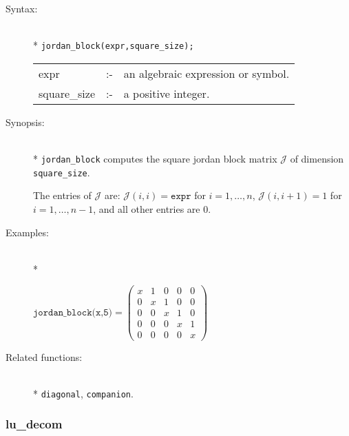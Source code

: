 \begin{description}
\item[Syntax:]\mbox{}\\*
\texttt{jordan\_block(expr,square\_size);}\\[2mm]
\begin{tabular}{l l l}
expr        &:-& an algebraic expression or symbol. \\
square\_size &:-& a positive integer.
\end{tabular}

\item[Synopsis:]\mbox{}\\*
\texttt{jordan\_block} computes the square jordan block matrix $\mathcal{J}$
                of dimension \texttt{square\_size}.

The entries of $\mathcal{J}$ are: $\mathcal{J}(i,i) = \texttt{expr}$ for
                $i=1,\ldots,n$, $\mathcal{J}(i,i+1) = 1$ for $i=1,\ldots,n-1$,
                and all other entries are 0.

\item[Examples:]\mbox{}\\*
\begin{flushleft}  
\begin{math}        
\texttt{jordan\_block(x,5)}  = 
 \begin{pmatrix} x & 1 & 0 & 0 & 0 \\ 0 & x & 1 & 0 & 0 \\ 0 
& 0 & x & 1 & 0 \\ 0 & 0 & 0 & x & 1 \\ 0 & 0 & 0 & 0 & x
 \end{pmatrix}
\end{math}  
\end{flushleft}

\item[Related functions:]\mbox{}\\*
\texttt{diagonal}, \texttt{companion}.
\end{description}


\subsubsection{lu\_decom}
\label{linalg:lu_decom}

